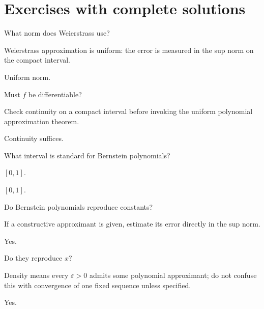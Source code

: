 \section{Exercises with complete solutions}

\begin{exercise}\label{exr:ii21-01}
What norm does Weierstrass use?
\end{exercise}
\begin{hint}
Weierstrass approximation is uniform: the error is measured in the sup norm on the compact interval.
\end{hint}
\begin{solution}
Uniform norm.
\end{solution}

\begin{exercise}\label{exr:ii21-02}
Must $f$ be differentiable?
\end{exercise}
\begin{hint}
Check continuity on a compact interval before invoking the uniform polynomial approximation theorem.
\end{hint}
\begin{solution}
Continuity suffices.
\end{solution}

\begin{exercise}\label{exr:ii21-03}
What interval is standard for Bernstein polynomials?
\end{exercise}
\begin{hint}
$[0,1]$.
\end{hint}
\begin{solution}
$[0,1]$.
\end{solution}

\begin{exercise}\label{exr:ii21-04}
Do Bernstein polynomials reproduce constants?
\end{exercise}
\begin{hint}
If a constructive approximant is given, estimate its error directly in the sup norm.
\end{hint}
\begin{solution}
Yes.
\end{solution}

\begin{exercise}\label{exr:ii21-05}
Do they reproduce $x$?
\end{exercise}
\begin{hint}
Density means every \(\varepsilon>0\) admits some polynomial approximant; do not confuse this with convergence of one fixed sequence unless specified.
\end{hint}
\begin{solution}
Yes.
\end{solution}

